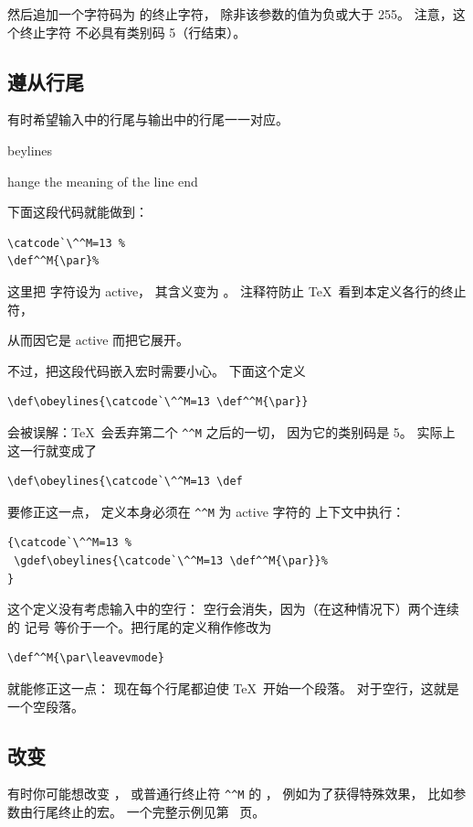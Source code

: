 \documentclass[a4paper]{rapport3}
\makeatletter
\def\alt{}\def\altt{}%
\def\howto#1\par{}
\def\cstoidx#1\par{\index{#1@\cs{#1}}}
\makeatother
\begin{document}
然后追加一个字符码为  的终止字符，
除非该参数的值为负或大于 255。
注意，这个终止字符
不必具有类别码 5（行结束）。

\subsection{遵从行尾}

有时希望输入中的行尾与输出中的行尾一一对应。
%
\cstoidx obeylines\par\howto Change the meaning of the line end\par
下面这段代码就能做到：
\begin{verbatim}
\catcode`\^^M=13 %
\def^^M{\par}% 
\end{verbatim}
这里把  字符设为 active，
其含义变为 。
注释符防止 \TeX\ 看到本定义各行的终止符，
\alt
从而因它是 active 而把它展开。

不过，把这段代码嵌入宏时需要小心。
下面这个定义
\begin{verbatim}
\def\obeylines{\catcode`\^^M=13 \def^^M{\par}}
\end{verbatim}
会被误解：\TeX\ 会丢弃第二个 \verb>^^M> 之后的一切，
因为它的类别码是 5。
实际上这一行就变成了
\begin{verbatim}
\def\obeylines{\catcode`\^^M=13 \def
\end{verbatim}
要修正这一点，
定义本身必须在 \verb>^^M> 为 active 字符的
上下文中执行：\begin{verbatim}
{\catcode`\^^M=13 %
 \gdef\obeylines{\catcode`\^^M=13 \def^^M{\par}}%
}
\end{verbatim}
这个定义没有考虑输入中的空行：
空行会消失，因为（在这种情况下）两个连续的  记号
等价于一个。把行尾的定义稍作修改为
\begin{verbatim}
\def^^M{\par\leavevmode}
\end{verbatim}
就能修正这一点：
现在每个行尾都迫使 \TeX\ 开始一个段落。
对于空行，这就是一个空段落。
\awp

\subsection{改变 }

有时你可能想改变 ，
或普通行终止符 \verb.^^M. 的 ，
例如为了获得特殊效果，
比如参数由行尾终止的宏。
一个完整示例见第~\pageref{pick:eol} 页。
\end{document}
